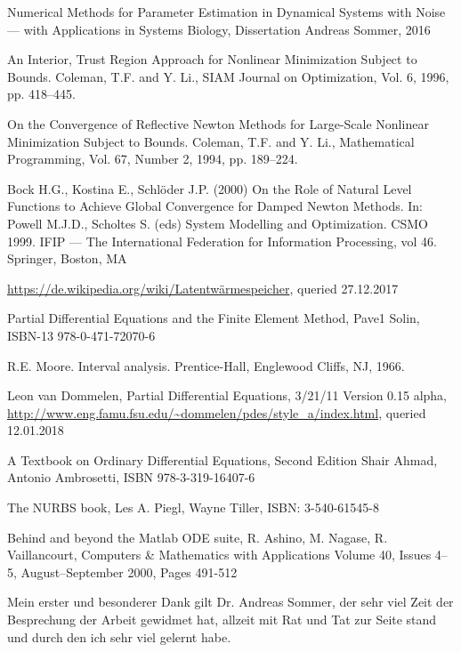 \documentclass{scrartcl}[12pt, halfparskip]
\numberwithin{equation}{section}
\numberwithin{figure}{section}
\numberwithin{table}{section}
\begin{document}
\begin{thebibliography}{9}
	Numerical Methods for Parameter Estimation
	in Dynamical Systems with Noise --- with Applications in Systems Biology,
	Dissertation Andreas Sommer, 2016
	
	An Interior, Trust Region Approach for Nonlinear Minimization Subject to Bounds.
	Coleman, T.F. and Y. Li., 
	SIAM Journal on Optimization, Vol. 6, 1996, pp. 418–445.
  
	On the Convergence of Reflective Newton Methods for Large-Scale Nonlinear Minimization Subject to Bounds.
	Coleman, T.F. and Y. Li., 
	Mathematical Programming, Vol. 67, Number 2, 1994, pp. 189–224.
	
	Bock H.G., Kostina E., Schlöder J.P. (2000) On the Role of Natural Level Functions to Achieve Global Convergence for Damped Newton Methods. In: Powell M.J.D., Scholtes S. (eds) System Modelling and Optimization. CSMO 1999. IFIP — The International Federation for Information Processing, vol 46. Springer, Boston, MA
	
	\url{https://de.wikipedia.org/wiki/Latentwärmespeicher}, queried 27.12.2017
	
	Partial Differential Equations and the Finite Element Method,
	Pave1 Solin, 
	ISBN-13 978-0-471-72070-6
	
	R.E. Moore. Interval analysis. Prentice-Hall, Englewood Cliffs, NJ, 1966.
  
	Leon van Dommelen, 
	Partial Differential Equations, 3/21/11 Version 0.15 alpha,
	\url{http://www.eng.famu.fsu.edu/~dommelen/pdes/style_a/index.html}, queried 12.01.2018
	
	A Textbook on Ordinary Differential Equations, Second Edition
	Shair Ahmad, Antonio Ambrosetti,
	ISBN 978-3-319-16407-6
	
	The NURBS book,
	Les A. Piegl, Wayne Tiller,
	ISBN: 3-540-61545-8 
	
	Behind and beyond the Matlab ODE suite,
	R. Ashino, M. Nagase, R. Vaillancourt,
	Computers \& Mathematics with Applications Volume 40, Issues 4–5, August–September 2000, Pages 491-512
  
\end{thebibliography}

\newpage
{}

Mein erster und besonderer Dank gilt Dr. Andreas Sommer, der sehr viel Zeit der Besprechung der Arbeit gewidmet hat, allzeit mit Rat und Tat zur Seite stand und durch den ich sehr viel gelernt habe.\\
\end{document}
